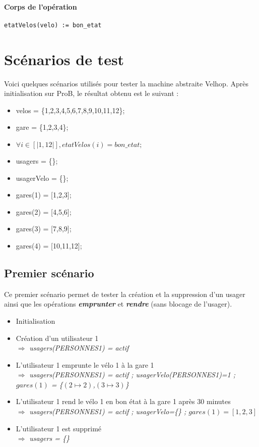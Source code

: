 \documentclass[12pt]{article}
\begin{document}
\paragraph{Corps de l'opération}
\textbf{}
\begin{lstlisting}[mathescape]
  etatVelos(velo) := bon_etat
\end{lstlisting}
\newpage
\section{Scénarios de test}
Voici quelques scénarios utilisés pour tester la machine abstraite Velhop. Après initialisation sur ProB, le résultat obtenu est le suivant :
\begin{itemize}
  \item velos = \{1,2,3,4,5,6,7,8,9,10,11,12\};
  \item gare = \{1,2,3,4\};
  \item $ \forall i \in [|1,12|], etatVelos(i) = bon\_etat;$
  \item usagers = \{\};
  \item usagerVelo = \{\};
  \item gares(1) = [1,2,3];
  \item gares(2) = [4,5,6];
  \item gares(3) = [7,8,9];
  \item gares(4) = [10,11,12];
\end{itemize}
\subsection{Premier scénario}
Ce premier scénario permet de tester la création et la suppression d'un usager ainsi que les opérations \textit{\textbf{emprunter}} et \textit{\textbf{rendre}} (sans blocage de l'usager).
\begin{itemize}
  \item Initialisation
  \item Création d'un utilisateur 1 \\
  $\Rightarrow$ \textit{usagers(PERSONNES1) = actif}
  \item L'utilisateur 1 emprunte le vélo 1 à la gare 1 \\
  $\Rightarrow$ \textit{usagers(PERSONNES1) = actif ; usagerVelo(PERSONNES1)=1 ; $gares(1)$ = \{$(2\mapsto2)$,$(3\mapsto3)$\}}
  \item L'utilisateur 1 rend le vélo 1 en bon état à la gare 1 après 30 minutes \\
  $\Rightarrow$ \textit{usagers(PERSONNES1) = actif ; usagerVelo=\{\} ; $gares(1) = [1,2,3]$}
  \item L'utilisateur 1 est supprimé \\
  $\Rightarrow$ \textit{usagers = \{\}}
\end{itemize}
\end{document}

